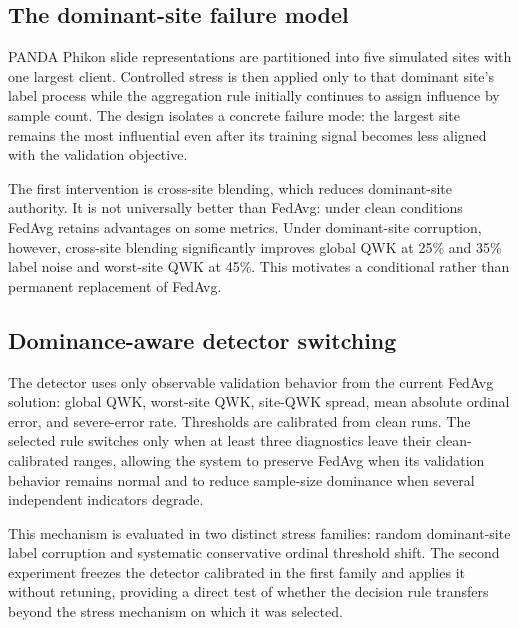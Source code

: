 \subsection{The dominant-site failure model}
PANDA Phikon slide representations are partitioned into five simulated sites with one largest client. Controlled stress is then applied only to that dominant site's label process while the aggregation rule initially continues to assign influence by sample count. The design isolates a concrete failure mode: the largest site remains the most influential even after its training signal becomes less aligned with the validation objective.

The first intervention is cross-site blending, which reduces dominant-site authority. It is not universally better than FedAvg: under clean conditions FedAvg retains advantages on some metrics. Under dominant-site corruption, however, cross-site blending significantly improves global QWK at 25\% and 35\% label noise and worst-site QWK at 45\%. This motivates a conditional rather than permanent replacement of FedAvg.

\subsection{Dominance-aware detector switching}
The detector uses only observable validation behavior from the current FedAvg solution: global QWK, worst-site QWK, site-QWK spread, mean absolute ordinal error, and severe-error rate. Thresholds are calibrated from clean runs. The selected rule switches only when at least three diagnostics leave their clean-calibrated ranges, allowing the system to preserve FedAvg when its validation behavior remains normal and to reduce sample-size dominance when several independent indicators degrade.

This mechanism is evaluated in two distinct stress families: random dominant-site label corruption and systematic conservative ordinal threshold shift. The second experiment freezes the detector calibrated in the first family and applies it without retuning, providing a direct test of whether the decision rule transfers beyond the stress mechanism on which it was selected.
